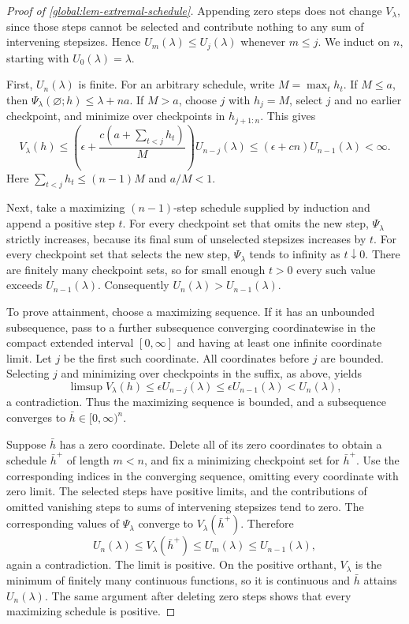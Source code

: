 \documentclass[11pt,letterpaper]{article}
\theoremstyle{definition}
\begin{document}
\begin{proof}[Proof of \cref{global:lem-extremal-schedule}]
Appending zero steps does not change $V_\lambda$, since those steps cannot be selected and contribute nothing to any sum of intervening stepsizes.
Hence $U_m(\lambda)\le U_j(\lambda)$ whenever $m\le j$.
We induct on $n$, starting with $U_0(\lambda)=\lambda$.

First, $U_n(\lambda)$ is finite.
For an arbitrary schedule, write $M=\max_t h_t$.
If $M\le a$, then $\Psi_\lambda(\varnothing;h)\le\lambda+na$.
If $M>a$, choose $j$ with $h_j=M$, select $j$ and no earlier checkpoint, and minimize over checkpoints in $h_{j+1:n}$.
This gives
\[
  V_\lambda(h)
  \le\left(\epsilon+\frac{c(a+\sum_{t<j}h_t)}{M}\right)
       U_{n-j}(\lambda)
  \le(\epsilon+cn)U_{n-1}(\lambda)<\infty.
\]
Here $\sum_{t<j}h_t\le(n-1)M$ and $a/M<1$.

Next, take a maximizing $(n-1)$-step schedule supplied by induction and append a positive step $t$.
For every checkpoint set that omits the new step, $\Psi_\lambda$ strictly increases, because its final sum of unselected stepsizes increases by $t$.
For every checkpoint set that selects the new step, $\Psi_\lambda$ tends to infinity as $t\downarrow0$.
There are finitely many checkpoint sets, so for small enough $t>0$ every such value exceeds $U_{n-1}(\lambda)$.
Consequently $U_n(\lambda)>U_{n-1}(\lambda)$.

To prove attainment, choose a maximizing sequence.
If it has an unbounded subsequence, pass to a further subsequence converging coordinatewise in the compact extended interval $[0,\infty]$ and having at least one infinite coordinate limit.
Let $j$ be the first such coordinate.
All coordinates before $j$ are bounded.
Selecting $j$ and minimizing over checkpoints in the suffix, as above, yields
\[
  \limsup V_\lambda(h)
  \le\epsilon U_{n-j}(\lambda)
  \le\epsilon U_{n-1}(\lambda)<U_n(\lambda),
\]
a contradiction.
Thus the maximizing sequence is bounded, and a subsequence converges to $\bar h\in[0,\infty)^n$.

Suppose $\bar h$ has a zero coordinate.
Delete all of its zero coordinates to obtain a schedule $\bar h^+$ of length $m<n$, and fix a minimizing checkpoint set for $\bar h^+$.
Use the corresponding indices in the converging sequence, omitting every coordinate with zero limit.
The selected steps have positive limits, and the contributions of omitted vanishing steps to sums of intervening stepsizes tend to zero.
The corresponding values of $\Psi_\lambda$ converge to $V_\lambda(\bar h^+)$.
Therefore
\[
  U_n(\lambda)\le V_\lambda(\bar h^+)
  \le U_m(\lambda)\le U_{n-1}(\lambda),
\]
again a contradiction.
The limit is positive.
On the positive orthant, $V_\lambda$ is the minimum of finitely many continuous functions, so it is continuous and $\bar h$ attains $U_n(\lambda)$.
The same argument after deleting zero steps shows that every maximizing schedule is positive.


\end{proof}
\end{document}
